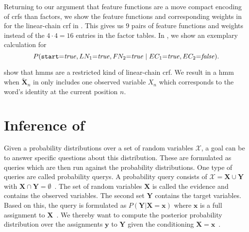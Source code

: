 Returning to our argument that \glspl{feature function} are a move compact encoding of \glspl{crf} than \glspl{factor}, we show the \glspl{feature function} and corresponding weights in  for the \gls{linear-chain crf} in .
This gives us $9$ pairs of \glspl{feature function} and weights instead of the $4\cdot 4=16$ entries in the \gls{factor} tables.
In , we show an exemplary calculation for
\begin{equation*}
P(\texttt{start}{=}\mathit{true},LN_1{=}\mathit{true},F\hspace{-0.07em} N_2{=}\mathit{true}\mid EC_1{=}\mathit{true},EC_2{=}\mathit{false}).
\end{equation*}
\bigskip

\citet{sutton2010introduction} show that \glspl{hmm} are a restricted kind of \gls{linear-chain crf}.
We result in a \gls{hmm} when $\mathbf{\tilde{X}}_n$ in  only includes one \gls{observed variable} $X_n$ which corresponds to the word's identity at the current position $n$.

\section{Inference of }\label{sec:inference-crfs}

Given a \glspl{probability distribution} over a set of \glspl{random variable} $\mathcal{X}$, a goal can be to answer specific questions about this distribution.
These are formulated as queries which are then run against the \glspl{probability distribution}.
One type of queries are called \glspl{probability query}.
A \gls{probability query} consists of $\mathcal{X}=\mathbf{X}\cup\mathbf{Y}$ with $\mathbf{X}\cap\mathbf{Y}=\emptyset$~\citep{koller2009probabilistic}.
The set of \glspl{random variable} $\mathbf{X}$ is called the \gls{evidence} and contains the \glspl{observed variable}.
The second set $\mathbf{Y}$ contains the \glspl{target variable}.
Based on this, the query is formulated as $P(\mathbf{Y}|\mathbf{X}=\mathbf{x})$ where $\mathbf{x}$ is a \gls{full assignment} to $\mathbf{X}$~\citep{koller2009probabilistic}.
We thereby want to compute the posterior \gls{probability distribution} over the assignments $\mathbf{y}$ to $\mathbf{Y}$ given the conditioning $\mathbf{X}=\mathbf{x}$~\citep{koller2009probabilistic}.

